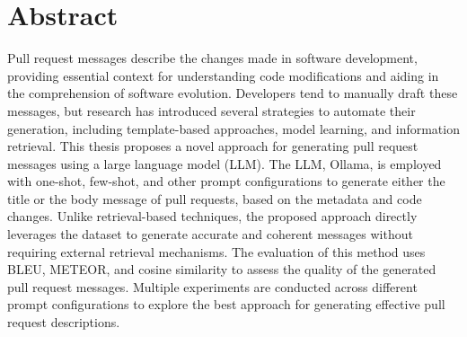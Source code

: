 \thispagestyle{plain}			%
\setlength{\parskip}{0pt plus 1.0pt}
\section*{Abstract}
Pull request messages describe the changes made in software development, providing essential context for understanding code modifications and aiding in the comprehension of software evolution. Developers tend to manually draft these messages, but research has introduced several strategies to automate their generation, including template-based approaches, model learning, and information retrieval. This thesis proposes a novel approach for generating pull request messages using a large language model (LLM). The LLM, Ollama, is employed with one-shot, few-shot, and other prompt configurations to generate either the title or the body message of pull requests, based on the metadata and code changes. Unlike retrieval-based techniques, the proposed approach directly leverages the dataset to generate accurate and coherent messages without requiring external retrieval mechanisms. The evaluation of this method uses BLEU, METEOR, and cosine similarity to assess the quality of the generated pull request messages. Multiple experiments are conducted across different prompt configurations to explore the best approach for generating effective pull request descriptions.

\vfill


\thispagestyle{empty}
\mbox{}